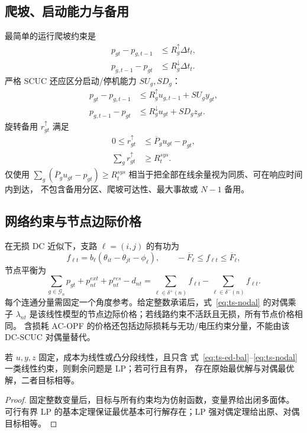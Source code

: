 \subsection{爬坡、启动能力与备用}
最简单的运行爬坡约束是
\begin{align}
p_{gt}-p_{g,t-1}&\le R_g^\uparrow\Delta t_t,\\
p_{g,t-1}-p_{gt}&\le R_g^\downarrow\Delta t_t.\label{eq:ts-ramp}
\end{align}
严格 SCUC 还应区分启动/停机能力 $SU_g,SD_g$：
\begin{align}
p_{gt}-p_{g,t-1}&\le R_g^\uparrow u_{g,t-1}+SU_gy_{gt},\\
p_{g,t-1}-p_{gt}&\le R_g^\downarrow u_{gt}+SD_gz_{gt}.\label{eq:ts-ramp-tight}
\end{align}
旋转备用 $r_{gt}^{\uparrow}$ 满足
\begin{align}
0\le r_{gt}^{\uparrow}&\le \overline P_gu_{gt}-p_{gt},\\
\sum_g r_{gt}^{\uparrow}&\ge R_t^{sys}.\label{eq:ts-reserve}
\end{align}
仅使用 $\sum_g(\overline P_gu_{gt}-p_{gt})\ge R_t^{sys}$ 相当于把全部在线余量视为同质、可在响应时间内到达，
不包含备用分区、爬坡可达性、最大事故或 $N-1$ 备用。

\subsection{网络约束与节点边际价格}
在无损 DC 近似下，支路 $\ell=(i,j)$ 的有功为
\begin{equation}
f_{\ell t}=b_\ell(\theta_{it}-\theta_{jt}-\phi_\ell),\qquad
-\overline F_\ell\le f_{\ell t}\le\overline F_\ell,\label{eq:ts-dcpf}
\end{equation}
节点平衡为
\begin{equation}
\sum_{g\in\mathcal G_n}p_{gt}+p^{ext}_{nt}+p^{res}_{nt}-d_{nt}
=\sum_{\ell\in\delta^+(n)}f_{\ell t}-\sum_{\ell\in\delta^-(n)}f_{\ell t}.\label{eq:ts-nodal}
\end{equation}
每个连通分量需固定一个角度参考。给定整数承诺后，式~\eqref{eq:ts-nodal} 的对偶乘子
$\lambda_{nt}$ 是该线性模型的节点边际价格；若线路约束不活跃且无损，所有节点价格相同。
含损耗 AC-OPF 的价格还包括边际损耗与无功/电压约束分量，不能由该 DC-SCUC 对偶量替代。

\begin{theorem}[固定承诺后的凸性与强对偶]\label{thm:ts-fixed-uc}
若 $u,y,z$ 固定，成本为线性或凸分段线性，且只含
式~\eqref{eq:ts-ed-bal}--\eqref{eq:ts-nodal} 一类线性约束，则剩余问题是 LP；若可行且有界，
存在原始最优解与对偶最优解，二者目标相等。
\end{theorem}
\begin{proof}
固定整数变量后，目标与所有约束均为仿射函数，变量界给出闭多面体。
可行有界 LP 的基本定理保证最优基本可行解存在；LP 强对偶定理给出原、对偶目标相等。
\end{proof}

